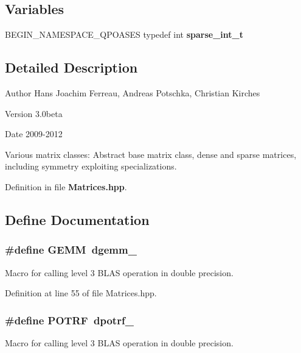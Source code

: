 \subsection*{Variables}
\begin{DoxyCompactItemize}
\item 
BEGIN\_\-NAMESPACE\_\-QPOASES typedef int {\bf sparse\_\-int\_\-t}
\end{DoxyCompactItemize}


\subsection{Detailed Description}
\begin{DoxyAuthor}{Author}
Hans Joachim Ferreau, Andreas Potschka, Christian Kirches 
\end{DoxyAuthor}
\begin{DoxyVersion}{Version}
3.0beta 
\end{DoxyVersion}
\begin{DoxyDate}{Date}
2009-\/2012
\end{DoxyDate}
Various matrix classes: Abstract base matrix class, dense and sparse matrices, including symmetry exploiting specializations. 

Definition in file {\bf Matrices.hpp}.



\subsection{Define Documentation}
\subsubsection[{GEMM}]{\setlength{\rightskip}{0pt plus 5cm}\#define GEMM~dgemm\_\-}\label{Matrices_8hpp_a68c6925602a91b3f1b335f64f533350c}
Macro for calling level 3 BLAS operation in double precision. 

Definition at line 55 of file Matrices.hpp.

\subsubsection[{POTRF}]{\setlength{\rightskip}{0pt plus 5cm}\#define POTRF~dpotrf\_\-}\label{Matrices_8hpp_a39fd888b29dc1aba3c780981acdd7f62}
Macro for calling level 3 BLAS operation in double precision. 

